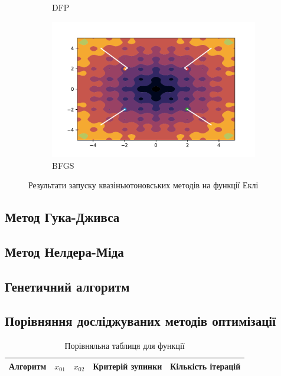 \begin{figure}[h!]
\begin{subfigure}{0.5\textwidth}
        \caption{DFP}
    \end{subfigure}
    \begin{subfigure}{0.5\textwidth}
        \includegraphics[width=\textwidth, trim=1.4cm 0.5cm 1.3cm 1cm, clip]{assets/BFGS/ackley.pdf}
        \caption{BFGS}
    \end{subfigure}
    \caption{Результати запуску квазіньютоновських методів на функції Еклі}
\end{figure}

\pagebreak
\subsection*{Метод Гука-Дживса}

\subsection*{Метод Нелдера-Міда}

\subsection*{Генетичний алгоритм}

\pagebreak
\subsection*{Порівняння досліджуваних методів оптимізації}
\begin{table}[h!]
    \centering
    \begin{tabular}{|c|c|c|c|c|}
        \hline
        \textbf{Алгоритм} & $x_{01}$ & $x_{02}$ & \textbf{Критерій зупинки} & \textbf{Кількість ітерацій}  \\
        \hline

    \end{tabular}
    \caption{Порівняльна таблиця для функції }
\end{table}
